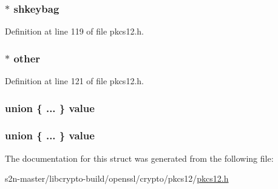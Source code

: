 \subsubsection[{\texorpdfstring{shkeybag}{shkeybag}}]{$\ast$ shkeybag}\hypertarget{struct_p_k_c_s12___s_a_f_e_b_a_g_a79f07c88e77ba8b884eb8d941790db0c}{}\label{struct_p_k_c_s12___s_a_f_e_b_a_g_a79f07c88e77ba8b884eb8d941790db0c}


Definition at line 119 of file pkcs12.\+h.

\subsubsection[{\texorpdfstring{other}{other}}]{$\ast$ other}\hypertarget{struct_p_k_c_s12___s_a_f_e_b_a_g_a913b5f8be6ebbc8d847d25c9279ee3d2}{}\label{struct_p_k_c_s12___s_a_f_e_b_a_g_a913b5f8be6ebbc8d847d25c9279ee3d2}


Definition at line 121 of file pkcs12.\+h.

\subsubsection[{\texorpdfstring{value}{value}}]{\setlength{\rightskip}{0pt plus 5cm}union \{ ... \}   value}\hypertarget{struct_p_k_c_s12___s_a_f_e_b_a_g_a050eeec52efc7b626b50e04105a9192b}{}\label{struct_p_k_c_s12___s_a_f_e_b_a_g_a050eeec52efc7b626b50e04105a9192b}
\subsubsection[{\texorpdfstring{value}{value}}]{\setlength{\rightskip}{0pt plus 5cm}union \{ ... \}   value}\hypertarget{struct_p_k_c_s12___s_a_f_e_b_a_g_a219b93f612268557bd5b2b92b141e962}{}\label{struct_p_k_c_s12___s_a_f_e_b_a_g_a219b93f612268557bd5b2b92b141e962}


The documentation for this struct was generated from the following file\+:\begin{DoxyCompactItemize}
\item 
s2n-\/master/libcrypto-\/build/openssl/crypto/pkcs12/\hyperlink{crypto_2pkcs12_2pkcs12_8h}{pkcs12.\+h}\end{DoxyCompactItemize}
